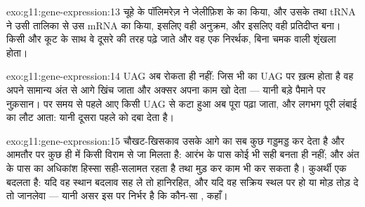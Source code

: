 \begin{solution}{exo:g11:gene-expression:13}
चूहे के  पॉलिमरेज़ ने जेलीफ़िश के  का  किया, और उसके 
तथा tRNA ने उसी  तालिका से उस mRNA का  किया, इसलिए वही  अनुक्रम, और इसलिए वही प्रतिदीप्त  बना। किसी और कूट के साथ वे
 दूसरे  की तरह पढ़े जाते और वह  एक निरर्थक, बिना
चमक वाली शृंखला होता।
\end{solution}

\begin{solution}{exo:g11:gene-expression:14}
UAG अब  रोकता ही नहीं: जिस भी  का  UAG पर ख़त्म होता है वह
अपने सामान्य अंत से आगे खिंच जाता और अक्सर अपना काम खो देता --- यानी बड़े
पैमाने पर नुक़सान। पर समय से पहले आए किसी UAG से कटा हुआ  अब पूरा पढ़ा
जाता, और लगभग पूरी लंबाई का  लौट आता: यानी दूसरा  पहले
को दबा देता है।
\end{solution}

\begin{solution}{exo:g11:gene-expression:15}
चौखट-खिसकाव उसके आगे का सब कुछ गड्डमड्ड कर देता है और आमतौर पर कुछ ही
 में किसी विराम से जा मिलता है: आरंभ के पास कोई भी सही  बनता
ही नहीं; और अंत के पास  का अधिकांश हिस्सा सही-सलामत रहता है तथा मुड़
कर काम भी कर सकता है। कुअर्थी एक  बदलता है: यदि वह स्थान बदलाव
सह ले तो हानिरहित, और यदि वह सक्रिय स्थल पर हो या मोड़ तोड़ दे तो जानलेवा
--- यानी असर इस पर निर्भर है कि कौन-सा , कहाँ।
\end{solution}

